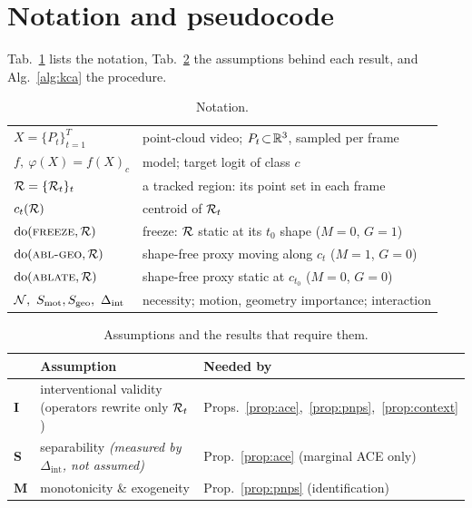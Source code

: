 \appendix

\section{Notation and pseudocode}
\label{supp:notation}
Tab.~\ref{tab:notation} lists the notation, Tab.~\ref{tab:assump} the assumptions behind each result, and Alg.~\ref{alg:kca} the procedure.

\begin{table}[h]
\centering\small
\begin{tabular}{ll}
\toprule
$X=\{P_t\}_{t=1}^{T}$ & point-cloud video; $P_t\!\subset\!\mathbb{R}^3$, sampled per frame \\
$f,\ \varphi(X){=}f(X)_c$ & model; target logit of class $c$ \\
$\mathcal{R}=\{\mathcal{R}_t\}_t$ & a tracked region: its point set in each frame \\
$c_t(\mathcal{R})$ & centroid of $\mathcal{R}_t$ \\
$\mathrm{do}(\textsc{freeze},\mathcal{R})$ & freeze: $\mathcal{R}$ static at its $t_0$ shape ($M{=}0$, $G{=}1$) \\
$\mathrm{do}(\textsc{abl-geo},\mathcal{R})$ & shape-free proxy moving along $c_t$ ($M{=}1$, $G{=}0$) \\
$\mathrm{do}(\textsc{ablate},\mathcal{R})$ & shape-free proxy static at $c_{t_0}$ ($M{=}0$, $G{=}0$) \\
$\Nec,\ \Smot,\Sgeo,\ \Delta_{\mathrm{int}}$ & necessity; motion, geometry importance; interaction \\
\bottomrule
\end{tabular}
\caption{Notation.}
\label{tab:notation}
\end{table}

\begin{table}[h]
\centering\small
\begin{tabular}{lll}
\toprule
& Assumption & Needed by \\
\midrule
\textbf{I} & interventional validity (operators rewrite only $\mathcal{R}_t$) & Props.~\ref{prop:ace},~\ref{prop:pnps},~\ref{prop:context} \\
\textbf{S} & separability \emph{(measured by $\Delta_{\mathrm{int}}$, not assumed)} & Prop.~\ref{prop:ace} (marginal ACE only) \\
\textbf{M} & monotonicity \& exogeneity & Prop.~\ref{prop:pnps} (identification) \\
\bottomrule
\end{tabular}
\caption{Assumptions and the results that require them.}
\label{tab:assump}
\end{table}

